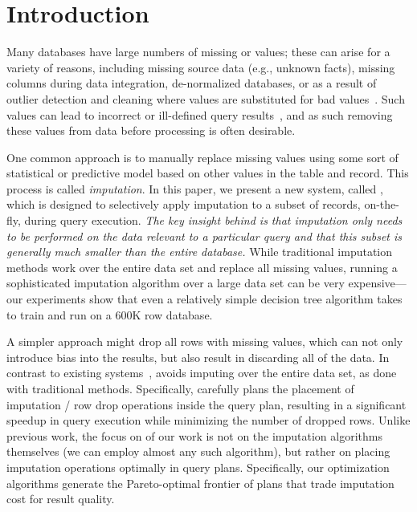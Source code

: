 \section{Introduction}

Many databases have large numbers of missing or \nullv{} values;  these can arise for a variety of reasons, including missing source data (e.g., unknown facts),
missing columns during data integration, de-normalized databases, or as a result of outlier detection and cleaning where \nullv{} values are substituted for
bad values~\cite{kim2003}.  Such \nullv{} values can lead to incorrect or ill-defined query results~\cite{rubin1976}, and as such removing these values from data
before processing is often desirable.

One common approach is to manually replace missing values using some sort of statistical or predictive model based on other values in the table and record.
This process is called \emph{imputation}.
In this paper, we present a new system, called \ProjectName{}, which is designed to selectively apply imputation to a subset of records, on-the-fly, during query execution.  \emph{The key insight behind \ProjectName{} is that imputation
only needs to be performed on the data relevant to a particular query and
that this subset is generally much smaller than the entire database.}  
While traditional imputation methods work over the entire data set and replace all missing
values, running a sophisticated imputation algorithm over a large data set can be very
expensive---our experiments show that even a relatively simple decision tree algorithm takes \acsbaseresulthours{} to train and run
on a 600K row database.

A simpler approach might drop all rows with missing values, which can not only introduce bias into the results, but also result in discarding all of the data.
In contrast to existing systems~\cite{burgette2010multiple,akande2015empirical}, \ProjectName{} avoids imputing over the entire data set, as done with traditional methods. Specifically, \ProjectName{}
carefully plans the placement of imputation / row drop operations inside the query plan, resulting in a 
significant speedup in query execution while minimizing the number of dropped rows. Unlike previous work, the focus on of our work is not on the imputation algorithms themselves (we can employ almost any such algorithm), but rather on placing imputation operations
optimally in query plans.   Specifically, our optimization algorithms generate the Pareto-optimal frontier of plans that trade imputation cost for result quality.

